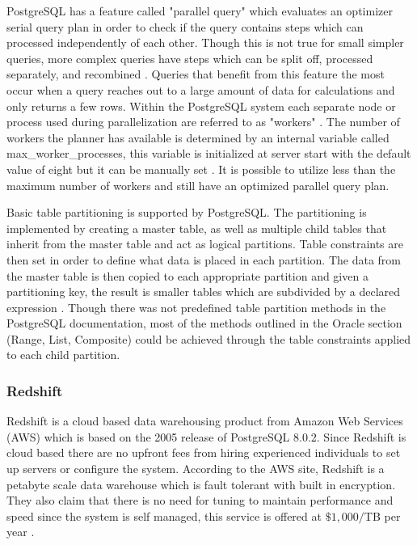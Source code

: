 \documentclass[draftclsnofoot, onecolumn, compsoc, 10pt]{IEEEtran}
\begin{document}
PostgreSQL has a feature called "parallel query" which evaluates an optimizer serial query plan in order to check if the query contains steps which can processed independently of each other.
Though this is not true for small simpler queries, more complex queries have steps which can be split off, processed separately, and recombined \cite{Documentation: 9.6: Parallel Query}.
Queries that benefit from this feature the most occur when a query reaches out to a large amount of data for calculations and only returns a few rows.
Within the PostgreSQL system each separate node or process used during parallelization are referred to as "workers" .
The number of workers the planner has available is determined by an internal variable called max\_worker\_processes, this variable is initialized at server start with the default value of eight but it can be manually set \cite{Documentation: 9.6: Parallel Query}.
It is possible to utilize less than the maximum number of workers and still have an optimized parallel query plan.

Basic table partitioning is supported by PostgreSQL.
The partitioning is implemented by creating a master table, as well as multiple child tables that inherit from the master table and act as logical partitions.
Table constraints are then set in order to define what data is placed in each partition.
The data from the master table is then copied to each appropriate partition and given a partitioning key, the result is smaller tables which are subdivided by a declared expression \cite{Documentation: 9.1: Partitioning}.
Though there was not predefined table partition methods in the PostgreSQL documentation, most of the methods outlined in the Oracle section (Range, List, Composite) could be achieved through the table constraints applied to each child partition.  

\subsubsection{Redshift}
Redshift is a cloud based data warehousing product from Amazon Web Services (AWS) which is based on the 2005 release of PostgreSQL 8.0.2. 
Since Redshift is cloud based there are no upfront fees from hiring experienced individuals to set up servers or configure the system.
According to the  AWS site, Redshift is a petabyte scale data warehouse which is fault tolerant with built in encryption.
They also claim that there is no need for tuning to maintain performance and speed since the system is self managed, this service is offered at $\$1,000/$TB per year \cite{General Information - Redshift}.
\end{document}
